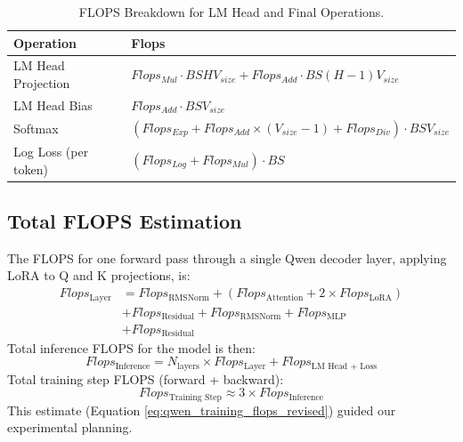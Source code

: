 \documentclass{article}
\begin{document}
\begin{table}[!th]
\renewcommand{\arraystretch}{1.4} \centering \setlength{\tabcolsep}{8pt}
\begin{tabular}{@{}ll@{}} %
    \toprule \textbf{Operation} & \textbf{Flops} \\ \midrule
    LM Head Projection & $Flops_{Mul} \cdot BSH V_{size} + Flops_{Add} \cdot BS(H - 1) V_{size}$ \\
    LM Head Bias & $Flops_{Add} \cdot BS V_{size}$ \\ %
    Softmax & $(Flops_{Exp} + Flops_{Add} \times (V_{size}-1) + Flops_{Div}) \cdot BS V_{size}$ \\ %
    Log Loss (per token) & $(Flops_{Log} + Flops_{Mul}) \cdot BS$ \\ %
    \bottomrule
\end{tabular}
\caption{FLOPS Breakdown for LM Head and Final Operations.} \label{tab:lm_head_flops}
\end{table}

\subsection{Total FLOPS Estimation}

The FLOPS for one forward pass through a single Qwen decoder layer, applying LoRA to Q and K projections, is:
\begin{align}
Flops_{\text{Layer}} &= Flops_{\text{RMSNorm}} + (Flops_{\text{Attention}} + 2 \times Flops_{\text{LoRA}}) \nonumber \\
                     &+ Flops_{\text{Residual}} + Flops_{\text{RMSNorm}} + Flops_{\text{MLP}} \nonumber \\
                     &+ Flops_{\text{Residual}} \label{eq:qwen_layer_flops}
\end{align}
Total inference FLOPS for the model is then:
\begin{equation}
Flops_{\text{Inference}} = N_{\text{layers}} \times Flops_{\text{Layer}} + Flops_{\text{LM Head + Loss}}
\label{eq:qwen_inference_flops_revised}
\end{equation}
Total training step FLOPS (forward + backward):
\begin{equation}
Flops_{\text{Training Step}} \approx 3 \times Flops_{\text{Inference}}
\label{eq:qwen_training_flops_revised}
\end{equation}
This estimate (Equation \ref{eq:qwen_training_flops_revised}) guided our experimental planning.
\end{document}
